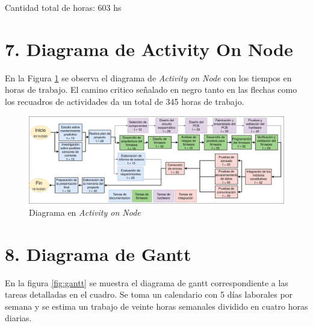 \documentclass[11pt]{charter}
\begin{document}
Cantidad total de horas: 603 hs


\section{7. Diagrama de Activity On Node}
\label{sec:AoN}

En la Figura \ref{fig:AoN} se observa el diagrama de \textit{Activity on Node} con los tiempos en horas de trabajo. El camino critico señalado en negro tanto en las flechas como los recuadros de actividades da un total de 345 horas de trabajo.

\begin{figure}[htpb]
\centering 
\includegraphics[width=1\textwidth]{./Figuras/AoN.png}
\caption{Diagrama en \textit{Activity on Node}}
\label{fig:AoN}
\end{figure}


\section{8. Diagrama de Gantt}
\label{sec:gantt}

En la figura \ref{fig:gantt} se muestra el diagrama de gantt correspondiente a las tareas detalladas en el cuadro. Se toma un calendario con 5 días laborales por semana y se estima un trabajo de veinte horas semanales dividido en cuatro horas diarias.
\end{document}
